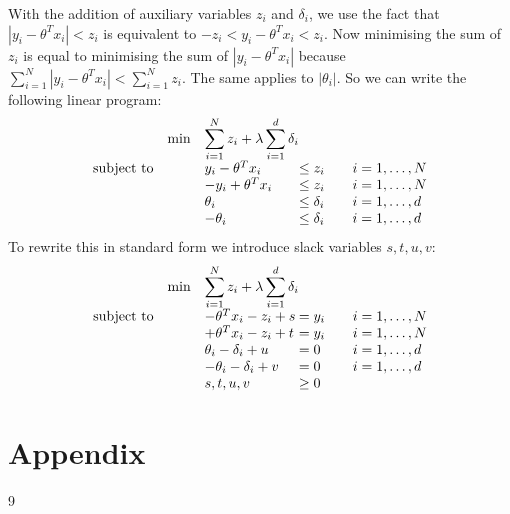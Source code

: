 \documentclass[10pt]{article}
\newenvironment{exercise}[2][Exercise]{\begin{trivlist}
  \item[\hskip \labelsep {\bfseries #1}\hskip \labelsep {\bfseries #2.}]}{\end{trivlist}}
\begin{document}
\begin{exercise}{2}
With the addition of auxiliary variables $z_i$ and $\delta_i$, we use the fact that $|y_i - \theta^T x_i| < z_i$ is equivalent to $-z_i < y_i - \theta^T x_i  < z_i$. Now minimising the sum of $z_i$ is equal to minimising the sum of $ |y_i-\theta^Tx_i|$ because $\sum\limits_{i=1}^{N}  |y_i-\theta^Tx_i| < \sum\limits_{i=1}^{N} z_i$. The same applies to $|\theta_i|$. So we can write the following linear program:
\begin{equation*}
\begin{array}{lll@{}lll}
&\text{min}  &\displaystyle\sum\limits_{i=1}^{N}z_i +  \lambda\sum\limits_{i=1}^{d}\delta_i &\\
\text{subject to} 
&& y_i-\theta^Tx_i &\leq z_i && i=1 ,\dots, N \\
&& -y_i+\theta^Tx_i &\leq z_i && i=1 ,\dots, N \\
                 && \theta_i &\leq \delta_i &&  i=1 ,\dots, d \\
                && -\theta_i &\leq \delta_i &&  i=1 ,\dots, d 
\end{array}
\end{equation*}
To rewrite this in standard form we introduce slack variables $s,t,u,v$: 
\begin{equation*}
\begin{array}{lll@{}lll}
&\text{min}  &\displaystyle\sum\limits_{i=1}^{N}z_i +  \lambda\sum\limits_{i=1}^{d}\delta_i &\\
\text{subject to} 
&& -\theta^Tx_i - z_i + s &= y_i && i=1 ,\dots, N \\
&& +\theta^Tx_i -z_i + t &= y_i && i=1 ,\dots, N \\
                 && \theta_i - \delta_i + u&= 0  &&  i=1 ,\dots, d \\
                && -\theta_i - \delta_i + v &= 0  &&  i=1 ,\dots, d 
                \\
                && s,t,u,v &\geq 0  && 
\end{array}
\end{equation*}



\end{exercise}
  

  \section*{Appendix}
\newpage  
 \begin{thebibliography}{9}

\end{thebibliography}
 
\end{document}

